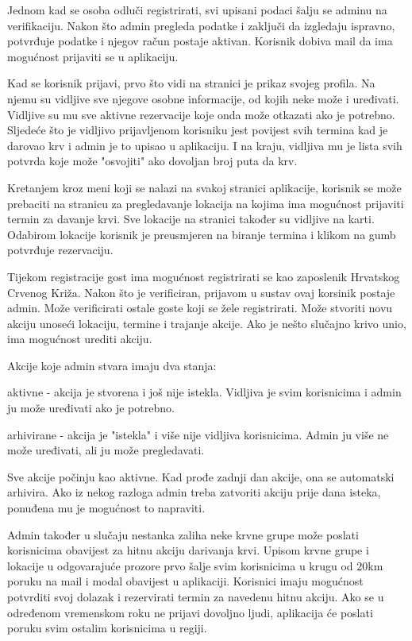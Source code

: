 		Jednom kad se osoba odluči registrirati, svi upisani podaci šalju se adminu na verifikaciju. Nakon što admin pregleda podatke i zaključi da izgledaju ispravno, potvrđuje podatke i njegov račun postaje aktivan. Korisnik dobiva mail da ima mogućnost prijaviti se u aplikaciju. 

		Kad se korisnik prijavi, prvo što vidi na stranici je prikaz svojeg profila. Na njemu su vidljive sve njegove osobne informacije, od kojih neke može i uređivati. Vidljive su mu sve aktivne rezervacije koje onda može otkazati ako je potrebno. Sljedeće što je vidljivo prijavljenom korisniku jest povijest svih termina kad je darovao krv i admin je to upisao u aplikaciju. I na kraju, vidljiva mu je lista svih potvrda koje može "osvojiti" ako dovoljan broj puta da krv. 

		Kretanjem kroz meni koji se nalazi na svakoj stranici aplikacije, korisnik se može prebaciti na stranicu za pregledavanje lokacija na kojima ima mogućnost prijaviti termin za davanje krvi. Sve lokacije na stranici također su vidljive na karti. Odabirom lokacije korisnik je preusmjeren na biranje termina i klikom na gumb potvrđuje rezervaciju. 

		Tijekom registracije gost ima mogućnost registrirati se kao zaposlenik Hrvatskog Crvenog Križa. Nakon što je verificiran, prijavom u sustav ovaj korsinik postaje admin. Može verificirati ostale goste koji se žele registrirati. Može stvoriti novu akciju unoseći lokaciju, termine i trajanje akcije. Ako je nešto slučajno krivo unio, ima mogućnost urediti akciju. 

		Akcije koje admin stvara imaju dva stanja:

		\begin{packed_item}
				\item aktivne - akcija je stvorena i još nije istekla. Vidljiva je svim korisnicima i admin ju može uređivati ako je potrebno.
				\item arhivirane - akcija je "istekla" i više nije vidljiva korisnicima. Admin ju više ne može uređivati, ali ju može pregledavati.
		\end{packed_item}

		Sve akcije počinju kao aktivne. Kad prođe zadnji dan akcije, ona se automatski arhivira. Ako iz nekog razloga admin treba zatvoriti akciju prije dana isteka, ponuđena mu je mogućnost to napraviti.


		Admin također u slučaju nestanka zaliha neke krvne grupe može poslati korisnicima obavijest za hitnu akciju darivanja krvi. Upisom krvne grupe i lokacije u odgovarajuće prozore prvo šalje svim korisnicima u krugu od 20km poruku na mail i modal obavijest u aplikaciji. Korisnici imaju mogućnost potvrditi svoj dolazak i rezervirati termin za navedenu hitnu akciju. Ako se u određenom vremenskom roku ne prijavi dovoljno ljudi, aplikacija će poslati poruku svim ostalim korisnicima u regiji.

